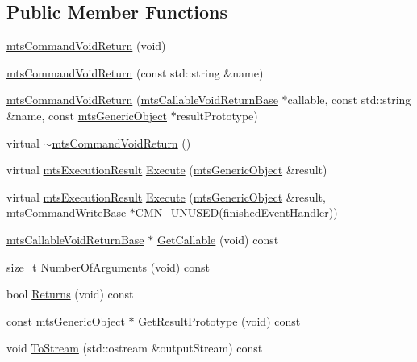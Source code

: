 \subsection*{Public Member Functions}
\begin{DoxyCompactItemize}
\item 
\hyperlink{classmts_command_void_return_a84b2df87b12e71023af81973c97ec4d5}{mts\+Command\+Void\+Return} (void)
\item 
\hyperlink{classmts_command_void_return_ac08a4ddcbf2a8ebbb6ea2656984c8f88}{mts\+Command\+Void\+Return} (const std\+::string \&name)
\item 
\hyperlink{classmts_command_void_return_ad8e8d4618f68defac066f5829e4fcd16}{mts\+Command\+Void\+Return} (\hyperlink{classmts_callable_void_return_base}{mts\+Callable\+Void\+Return\+Base} $\ast$callable, const std\+::string \&name, const \hyperlink{classmts_generic_object}{mts\+Generic\+Object} $\ast$result\+Prototype)
\item 
virtual \hyperlink{classmts_command_void_return_a2afc12e3d5e96bc31d4f523ea44e9bdf}{$\sim$mts\+Command\+Void\+Return} ()
\item 
virtual \hyperlink{classmts_execution_result}{mts\+Execution\+Result} \hyperlink{classmts_command_void_return_aae2d39f21bdefca19ee6bb4abc664ce1}{Execute} (\hyperlink{classmts_generic_object}{mts\+Generic\+Object} \&result)
\item 
virtual \hyperlink{classmts_execution_result}{mts\+Execution\+Result} \hyperlink{classmts_command_void_return_a286ec3b77f73dda7aa9a90a05ac77f7b}{Execute} (\hyperlink{classmts_generic_object}{mts\+Generic\+Object} \&result, \hyperlink{classmts_command_write_base}{mts\+Command\+Write\+Base} $\ast$\hyperlink{cmn_portability_8h_a021894e2626935fa2305434b1e893ff6}{C\+M\+N\+\_\+\+U\+N\+U\+S\+E\+D}(finished\+Event\+Handler))
\item 
\hyperlink{classmts_callable_void_return_base}{mts\+Callable\+Void\+Return\+Base} $\ast$ \hyperlink{classmts_command_void_return_ae51b5a892029231c81c830c228a2c76f}{Get\+Callable} (void) const 
\item 
size\+\_\+t \hyperlink{classmts_command_void_return_a69273f6aae517e8ddfbc72d35ad52770}{Number\+Of\+Arguments} (void) const 
\item 
bool \hyperlink{classmts_command_void_return_a6f0b136981f08438c113f79c22307723}{Returns} (void) const 
\item 
const \hyperlink{classmts_generic_object}{mts\+Generic\+Object} $\ast$ \hyperlink{classmts_command_void_return_a4374cba092b2ea18525906483c03086f}{Get\+Result\+Prototype} (void) const 
\item 
void \hyperlink{classmts_command_void_return_a38818dd8c12d96d4dd9c21dcfdbb905d}{To\+Stream} (std\+::ostream \&output\+Stream) const 
\end{DoxyCompactItemize}
